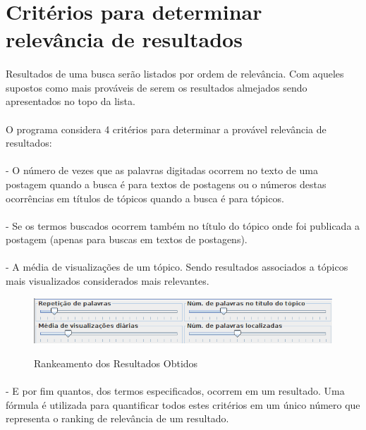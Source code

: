 \documentclass[a4paper,12pt,openany]{book}
\begin{document}
\section*{Critérios para determinar relevância de resultados}
\paragraph{}
Resultados de uma busca serão listados por ordem de relevância. Com aqueles supostos como mais prováveis de serem os resultados almejados sendo apresentados no topo da lista.
\paragraph{}
O programa considera 4 critérios para determinar a provável relevância de resultados:
\paragraph{}
- O número de vezes que as palavras digitadas ocorrem no texto de uma postagem quando a busca é para textos de postagens ou o números destas ocorrências em títulos de tópicos quando a busca é para tópicos.
\paragraph{}
- Se os termos buscados ocorrem também no título do tópico onde foi publicada a postagem (apenas para buscas em textos de postagens).
\paragraph{}
- A média de visualizações de um tópico. Sendo resultados associados a tópicos mais visualizados considerados mais relevantes.
\begin{figure}[h]
	\caption{Rankeamento dos Resultados Obtidos}
	
	\centering %
	\includegraphics[width=15cm]{Figuras/ajustando-relevancia.png} %
	\label{figura:qualquernome}
\end{figure}
\paragraph{}
- E por fim quantos, dos termos especificados, ocorrem em um resultado. Uma fórmula é utilizada para quantificar todos estes critérios em um único número que representa o
ranking de relevância de um resultado.
\end{document}
